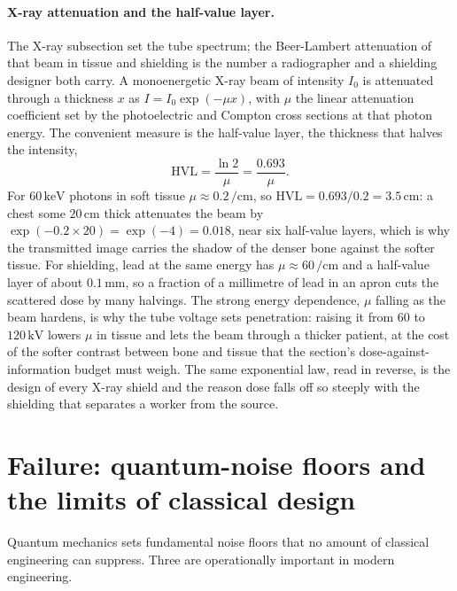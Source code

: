 \paragraph{X-ray attenuation and the half-value layer.}
The X-ray subsection set the tube spectrum; the Beer-Lambert attenuation of that
beam in tissue and shielding is the number a radiographer and a shielding designer
both carry. A monoenergetic X-ray beam of intensity $I_0$ is attenuated through a
thickness $x$ as $I = I_0\exp(-\mu x)$, with $\mu$ the linear attenuation
coefficient set by the photoelectric and Compton cross sections at that photon
energy. The convenient measure is the half-value layer, the thickness that halves
the intensity,
\[
\text{HVL} = \frac{\ln 2}{\mu} = \frac{0.693}{\mu}.
\]
For $60\,\si{\kilo\electronvolt}$ photons in soft tissue $\mu \approx 0.2\,\si{
\per\centi\meter}$, so $\text{HVL} = 0.693/0.2 = 3.5\,\si{\centi\meter}$: a chest
some $20\,\si{\centi\meter}$ thick attenuates the beam by $\exp(-0.2\times 20) =
\exp(-4) = 0.018$, near six half-value layers, which is why the transmitted
image carries the shadow of the denser bone against the softer tissue. For
shielding, lead at the same energy has $\mu \approx 60\,\si{\per\centi\meter}$
and a half-value layer of about $0.1\,\si{\milli\meter}$, so a fraction of a
millimetre of lead in an apron cuts the scattered dose by many halvings. The
strong energy dependence, $\mu$ falling as the beam hardens, is why the tube
voltage sets penetration: raising it from $60$ to $120\,\si{\kilo\volt}$ lowers
$\mu$ in tissue and lets the beam through a thicker patient, at the cost of the
softer contrast between bone and tissue that the section's dose-against-information
budget must weigh. The same exponential law, read in reverse, is the design of
every X-ray shield and the reason dose falls off so steeply with the shielding
that separates a worker from the source.





\section{Failure: quantum-noise floors and the limits of classical design}

Quantum mechanics sets fundamental noise floors that no amount of
classical engineering can suppress. Three are operationally important
in modern engineering.

